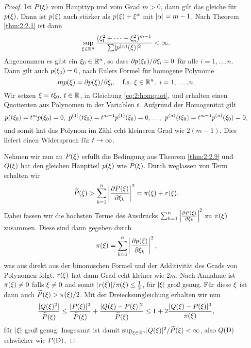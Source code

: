 \begin{proof}
Ist $P(\xi)$ vom Haupttyp und vom Grad $m>0$,
dann gilt das gleiche für $p(\xi)$.
Dann ist $p(\xi)$ auch stärker als $p(\xi)+\xi^\alpha$
mit $\lvert\alpha\rvert=m-1$.
Nach Theorem \ref{thm:2:2.1} ist dann
\begin{equation}\label{eq:2:homquot}
\sup_{\xi\in\mathbb R^n}\frac{(\xi^2_1+\dots+\xi^2_n)^{m-1}}{\sum\lvert p^{(\alpha)}(\xi)\rvert^2}<\infty.
\end{equation}
Angenommen es gibt ein $\xi_0\in\mathbb R^n$,
so dass $\partial p(\xi_0)/\partial\xi_i=0$ für alle $i=1,\dots,n$.
Dann gilt auch $p(\xi_0)=0$,
nach Eulers Formel für homogene Polynome
\begin{equation}
mp(\xi)=\partial p(\xi)/\partial\xi_i,\quad\text{f.a.}~\xi\in\mathbb R^n,~i=1,\dots,n.
\end{equation}
Wir setzen $\xi=t\xi_0$, $t\in\mathbb R$, in Gleichung \ref{eq:2:homquot},
und erhalten einen Quotienten aus Polynomen in der Variablen $t$.
Aufgrund der Homogenität gilt
\begin{equation}
p(t\xi_0)=t^mp(\xi_0)=0,~p^{(1)}(t\xi_0)=t^{m-1}p^{(1)}(\xi_0)=0,
\dots,~p^{(n)}(t\xi_0)=t^{m-1}p^{(n)}(\xi_0)=0,
\end{equation}
und somit hat das Polynom im Zähl echt kleineren Grad wie $2(m-1)$.
Dies liefert einen Widerspruch für $t\to\infty$.

Nehmen wir nun an $P(\xi)$ erfüllt die Bedingung aus Theorem \ref{thm:2:2.9}
und $Q(\xi)$ hat den gleichen Hauptteil $p(\xi)$ wie $P(\xi)$.
Durch weglassen von Term erhalten wir
\begin{equation}
\widetilde{P}(\xi)>\sum_{k=1}^n\left\lvert\frac{\partial P(\xi)}{\partial\xi_k}\right\rvert^2=\pi(\xi)+r(\xi).
\end{equation}
Dabei fassen wir die höchsten Terme des Ausdrucks
$\sum_{k=1}^n\left\lvert\frac{\partial P(\xi)}{\partial\xi_k}\right\rvert^2$ zu $\pi(\xi)$ zusammen.
Diese sind dann gegeben durch
\begin{equation}
\pi(\xi)=\sum_{k=1}^n\left\lvert\frac{\partial p(\xi)}{\partial\xi_k}\right\rvert^2,
\end{equation}
was aus direkt aus der binomischen Formel
und der Additivität des Grads von Polynomen folgt.
$r(\xi)$ hat dann Grad echt kleiner wie $2m$.
Nach Annahme ist $\pi(\xi)\neq0$ falls $\xi\neq0$
and somit $\lvert r(\xi)\rvert/\pi(\xi)\leq\tfrac12$,
für $\lvert\xi\rvert$ groß genug.
Für diese $\xi$ ist dann auch $\widetilde{P}(\xi)>\pi(\xi)/2$.
Mit der Dreiecksungleichung erhalten wir nun
\begin{equation}
\frac{\lvert Q(\xi)^2\rvert}{\widetilde{P}(\xi)}
\leq\frac{\lvert P(\xi)\rvert^2}{\widetilde{P}(\xi)}+\frac{\lvert Q(\xi)-P(\xi)\rvert^2}{\widetilde{P}(\xi)}
\leq1+2\frac{\lvert Q(\xi)-P(\xi)\rvert^2}{\pi(\xi)},
\end{equation}
für $\lvert\xi\rvert$ groß genug.
Insgesamt ist damit $\sup_{\xi\in\mathbb R^n}\lvert Q(\xi)\rvert^2/\widetilde{P}(\xi)<\infty$,
also $Q(\mathrm D)$ schwächer wie $P(\mathrm D)$.
\end{proof}

